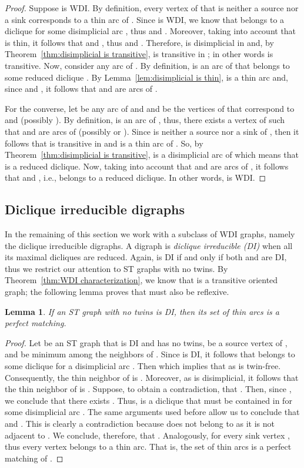 \documentclass[a4paper,11pt]{article}
\newtheorem{lemma}[theorem]{Lemma}
\begin{document}
\begin{proof}
  Suppose  is WDI.  By definition, every vertex  of  that is neither a source nor a sink corresponds to a thin arc  of .  Since  is WDI, we know that  belongs to a diclique  for some disimplicial arc , thus  and . Moreover, taking into account that  is thin, it follows that  and , thus  and .  Therefore,  is disimplicial in  and, by Theorem~\ref{thm:disimplicial is transitive},  is transitive in ; in other words  is transitive.  Now, consider any arc  of .  By definition,  is an arc of  that belongs to some reduced diclique .  By Lemma~\ref{lem:disimplicial is thin},  is a thin arc and, since  and , it follows that  and  are arcs of .  

  For the converse, let  be any arc of  and  and  be the vertices of  that correspond to  and  (possibly ).  By definition,  is an arc of , thus, there exists a vertex  of  such that  and  are arcs of  (possibly  or ).  Since  is neither a source nor a sink of , then it follows that  is transitive in  and  is a thin arc of .  So, by Theorem~\ref{thm:disimplicial is transitive},  is a disimplicial arc of  which means that  is a reduced diclique.  Now, taking into account that  and  are arcs of , it follows that  and , i.e.,  belongs to a reduced diclique.  In other words,  is WDI.
\end{proof}

\subsection{Diclique irreducible digraphs}

In the remaining of this section we work with a subclass of WDI graphs, namely the diclique irreducible digraphs.  A digraph  is \emph{diclique irreducible (DI)} when all its maximal dicliques are reduced.  Again,  is DI if and only if both  and  are DI, thus we restrict our attention to ST graphs with no twins.  By Theorem~\ref{thm:WDI characterization}, we know that  is a transitive oriented graph; the following lemma proves that  must also be reflexive.

\begin{lemma}
 If an ST graph with no twins is DI, then its set of thin arcs is a perfect matching.
\end{lemma}

\begin{proof}
  Let  be an ST graph that is DI and has no twins,  be a source vertex of , and  be minimum among the neighbors of .  Since  is DI, it follows that  belongs to some diclique  for a disimplicial arc .  Then  which implies that  as  is twin-free.  Consequently, the thin neighbor of  is .  Moreover, as  is disimplicial, it follows that the thin neighbor of  is .  Suppose, to obtain a contradiction, that .  Then, since , we conclude that there exists .  Thus,  is a diclique that must be contained in  for some disimplicial arc .  The same arguments used before allow us to conclude that  and .  This is clearly a contradiction because  does not belong to  as it is not adjacent to . We conclude, therefore, that .  Analogously,  for every sink vertex , thus every vertex belongs to a thin arc.  That is, the set of thin arcs is a perfect matching of .
\end{proof}
\end{document}

